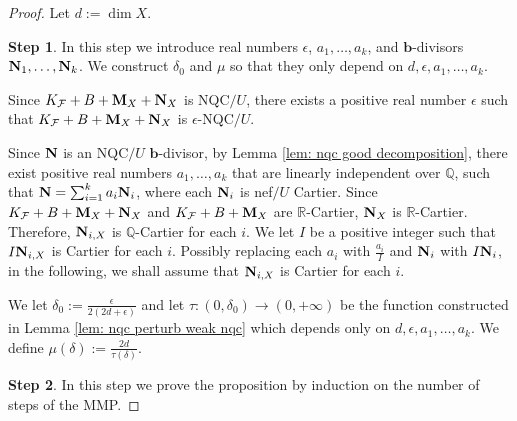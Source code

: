 \documentclass[11pt]{amsart}
\numberwithin{equation}{section}
\newcommand{\bb}{\bm{b}}
\newcommand{\Mm}{{\bf{M}}}
\newcommand{\Nn}{{\bf{N}}}
\newcommand{\Qq}{\mathbb{Q}}
\newcommand{\Rr}{\mathbb{R}}
\newcommand{\Ff}{\mathcal{F}}
\theoremstyle{definition}
\theoremstyle{definition}
\theoremstyle{definition}
\begin{document}
\begin{proof}
Let $d:=\dim X$.

\medskip

\noindent\textbf{Step 1}. In this step we introduce real numbers $\epsilon$, $a_1,\dots,a_k$, and $\bb$-divisors $\Nn_1,\dots,\Nn_k$. We construct  $\delta_0$ and $\mu$ so that they only depend on $d,\epsilon,a_1,\dots,a_k$.
 
 
 Since $K_{\Ff}+B+\Mm_X+\Nn_X$ is NQC$/U$, there exists a positive real number $\epsilon$ such that  $K_{\Ff}+B+\Mm_X+\Nn_X$ is $\epsilon$-NQC$/U$.

Since $\Nn$ is an NQC$/U$ $\bb$-divisor, by Lemma \ref{lem: nqc good decomposition}, there exist positive real numbers $a_1,\dots,a_k$ that are linearly independent over $\mathbb Q$, such that $\Nn=\sum_{i=1}^ka_i\Nn_i$, where each $\Nn_i$ is nef$/U$ Cartier. Since $K_{\Ff}+B+\Mm_X+\Nn_X$ and $K_{\Ff}+B+\Mm_X$ are $\Rr$-Cartier, $\Nn_X$ is $\Rr$-Cartier. Therefore, $\Nn_{i,X}$ is $\Qq$-Cartier for each $i$. We let $I$ be a positive integer such that $I\Nn_{i,X}$ is Cartier for each $i$. Possibly replacing each $a_i$ with $\frac{a_i}{I}$ and $\Nn_i$ with $I\Nn_i$, in the following, we shall assume that $\Nn_{i,X}$ is Cartier for each $i$.

We let $\delta_0:=\frac{\epsilon}{2(2d+\epsilon)}$ and let $\tau: (0,\delta_0)\rightarrow (0,+\infty)$ be the function constructed in Lemma \ref{lem: nqc perturb weak nqc} which depends only on $d,\epsilon,a_1,\dots,a_k$.  We define $\mu(\delta):=\frac{2d}{\tau(\delta)}$. 

\medskip


\noindent\textbf{Step 2}. In this step we prove the proposition by induction on the number of steps of the MMP.


\end{proof}
\end{document}

